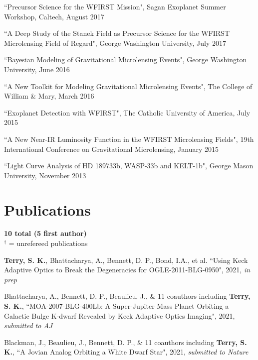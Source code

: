 \documentclass[margin,line]{res}
\begin{document}
\begin{resume}
\begin{etaremune}
\item ``Precursor Science for the WFIRST Mission", Sagan Exoplanet Summer Workshop, Caltech, August 2017

\item ``A Deep Study of the Stanek Field as Precursor Science for the WFIRST Microlensing Field of Regard", George Washington University, July 2017

\item ``Bayesian Modeling of Gravitational Microlensing Events", George Washington University, June 2016

\item ``A New Toolkit for Modeling Gravitational Microlensing Events", The College of William \& Mary, March 2016

\item ``Exoplanet Detection with WFIRST", The Catholic University of America, July 2015

\item ``A New Near-IR Luminosity Function in the WFIRST Microlensing Fields", 19th International Conference on Gravitational Microlensing, January 2015

\item ``Light Curve Analysis of HD 189733b, WASP-33b and KELT-1b", George Mason University, November 2013 \\

\end{etaremune}

\section{\sc Publications}
\textbf{10 total (5 first author)}\\
$^{\dagger}$ = unrefereed publications \\
\begin{etaremune}
\item \textbf{Terry, S. K.}, Bhattacharya, A., Bennett, D. P., Bond, I.A., et al. ``Using Keck Adaptive Optics to Break the Degeneracies for OGLE-2011-BLG-0950", 2021, \textit{in prep}

\item Bhattacharya, A., Bennett, D. P., Beaulieu, J., \& 11 coauthors including \textbf{Terry, S. K.}, ``MOA-2007-BLG-400Lb: A Super-Jupiter Mass Planet Orbiting a Galactic Bulge K-dwarf Revealed by Keck Adaptive Optics Imaging", 2021, \textit{submitted to AJ}

\item Blackman, J., Beaulieu, J., Bennett, D. P., \& 11 coauthors including {\bf Terry, S. K.}, ``A Jovian Analog Orbiting a White Dwarf Star", 2021, \textit{submitted to Nature}


\end{etaremune}
\end{resume}
\end{document}
